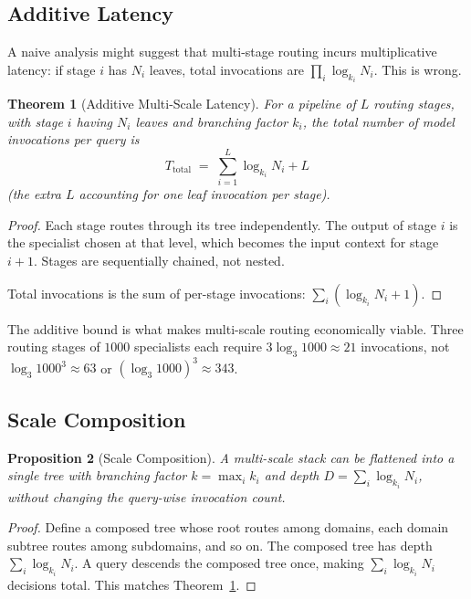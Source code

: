 \documentclass[11pt,a4paper]{article}
\newtheorem{theorem}{Theorem}[section]
\newtheorem{proposition}[theorem]{Proposition}
\theoremstyle{definition}
\theoremstyle{remark}
\begin{document}
\subsection{Additive Latency}

A naive analysis might suggest that multi-stage routing incurs multiplicative latency: if stage $i$ has $N_i$ leaves, total invocations are $\prod_i \log_{k_i} N_i$. This is wrong.

\begin{theorem}[Additive Multi-Scale Latency]
\label{thm:additive}
For a pipeline of $L$ routing stages, with stage $i$ having $N_i$ leaves and branching factor $k_i$, the total number of model invocations per query is
\[
T_{\text{total}} \;=\; \sum_{i=1}^L \log_{k_i} N_i + L
\]
(the extra $L$ accounting for one leaf invocation per stage).
\end{theorem}

\begin{proof}
Each stage routes through its tree independently. The output of stage $i$ is the specialist chosen at that level, which becomes the input context for stage $i+1$. Stages are sequentially chained, not nested.

Total invocations is the sum of per-stage invocations: $\sum_i (\log_{k_i} N_i + 1)$.
\end{proof}

The additive bound is what makes multi-scale routing economically viable. Three routing stages of $1000$ specialists each require $3 \log_3 1000 \approx 21$ invocations, not $\log_3 1000^3 \approx 63$ or $(\log_3 1000)^3 \approx 343$.

\subsection{Scale Composition}

\begin{proposition}[Scale Composition]
\label{prop:compose}
A multi-scale stack can be flattened into a single tree with branching factor $k = \max_i k_i$ and depth $D = \sum_i \log_{k_i} N_i$, without changing the query-wise invocation count.
\end{proposition}

\begin{proof}
Define a composed tree whose root routes among domains, each domain subtree routes among subdomains, and so on. The composed tree has depth $\sum_i \log_{k_i} N_i$. A query descends the composed tree once, making $\sum_i \log_{k_i} N_i$ decisions total. This matches Theorem~\ref{thm:additive}.
\end{proof}
\end{document}
